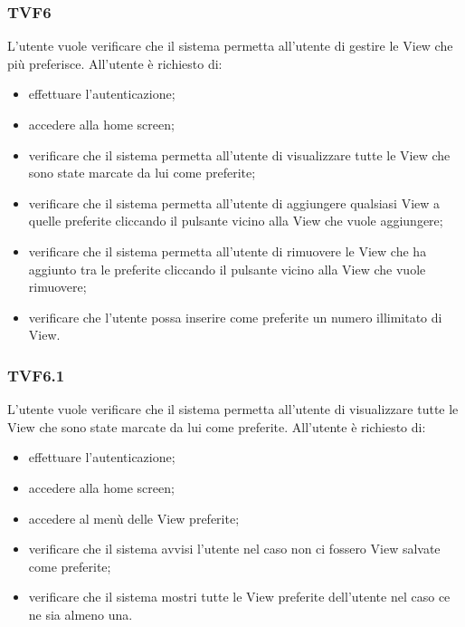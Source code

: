 		\subsubsection{TVF6}
			L'utente vuole verificare che il sistema permetta all'utente di gestire le View che più preferisce. All'utente è richiesto di:
			\begin{itemize}
				\item effettuare l'autenticazione;
				\item accedere alla home screen;
				\item verificare che il sistema permetta all'utente di visualizzare tutte le View che sono state marcate da lui come preferite;
				\item verificare che il sistema permetta all'utente di aggiungere qualsiasi View a quelle preferite cliccando il pulsante vicino alla View che vuole aggiungere;
				\item verificare che il sistema permetta all'utente di rimuovere le View che ha aggiunto tra le preferite cliccando il pulsante vicino alla View che vuole rimuovere;
				\item verificare che l'utente possa inserire come preferite un numero illimitato di View.
			\end{itemize}
			
		\subsubsection{TVF6.1}
			L'utente vuole verificare che il sistema permetta all'utente di visualizzare tutte le View che sono state marcate da lui come preferite. All'utente è richiesto di:
			\begin{itemize}
				\item effettuare l'autenticazione;
				\item accedere alla home screen;
				\item accedere al menù delle View preferite;
				\item verificare che il sistema avvisi l'utente nel caso non ci fossero View salvate come preferite;
				\item verificare che il sistema mostri tutte le View preferite dell'utente nel caso ce ne sia almeno una.
			\end{itemize}
			
